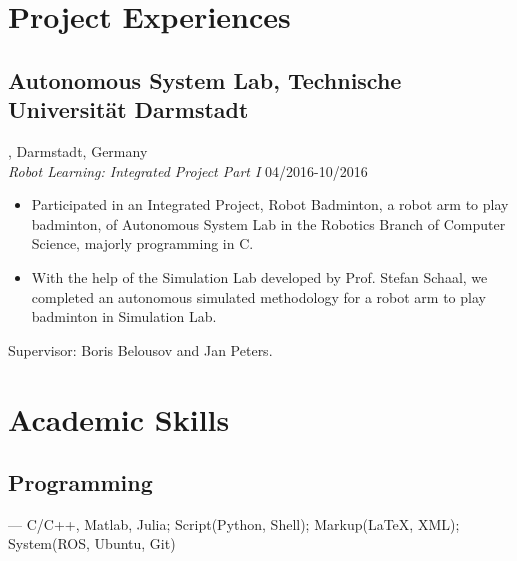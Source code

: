 \documentclass{article}
\begin{document}


\section{Project Experiences}
\subsection{Autonomous System Lab, Technische Universit\"at Darmstadt}, Darmstadt, Germany\\
\emph{Robot Learning: Integrated Project Part I }\hfill 04/2016-10/2016
\begin{itemize}[noitemsep,topsep=1pt]
\item Participated in an Integrated Project, Robot Badminton, a robot arm to play badminton, of Autonomous System Lab in the Robotics Branch of Computer Science, majorly programming in  C.
\item With the help of the Simulation Lab developed by Prof. Stefan Schaal, we completed an autonomous simulated methodology for a robot arm to play badminton in Simulation Lab.
\end{itemize}
Supervisor: Boris Belousov and Jan Peters.

\section{Academic Skills}
\subsection{Programming}
--- C/C++, Matlab, Julia; Script(Python, Shell); Markup({\LaTeX}, XML); System(ROS, Ubuntu, Git)
\end{document}
